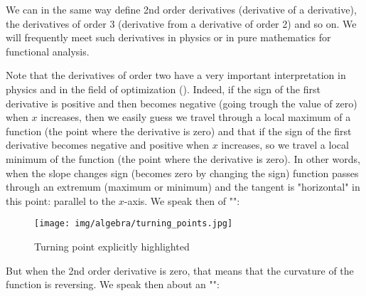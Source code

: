 We can in the same way define 2nd order derivatives (derivative of a derivative), the derivatives of order 3 (derivative from a derivative of order 2) and so on. We will  frequently meet such derivatives in physics or in pure mathematics for functional analysis.

Note that the derivatives of order two have a very important interpretation in physics and in the field of optimization (). Indeed, if the sign of the first derivative is positive and then becomes negative (going trough the value of zero) when $x$ increases, then we easily guess we travel through a local maximum of a function (the point where the derivative is zero) and that if the sign of the first derivative becomes negative and positive when $x$ increases, so we travel a local minimum of the function (the point where the derivative is zero). In other words, when the slope changes sign (becomes zero by changing the sign) function passes through an extremum (maximum or minimum) and the tangent is "horizontal" in this point: parallel to the $x$-axis. We speak then of "\label{turning point}":
	\begin{figure}[H]
		\centering
		\texttt{[image: img/algebra/turning\_points.jpg]}
		\caption{Turning point explicitly highlighted}
	\end{figure}
	But when the 2nd order derivative is zero, that means that the curvature of the function is reversing. We speak then about an "\label{inflection point}":
